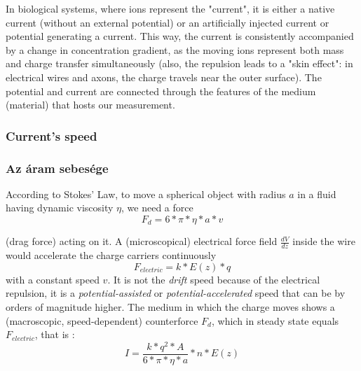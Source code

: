 \fi

\ifx\magyar\undefined
In biological systems, where ions represent the "current", it is either a native current (without an external potential) or an artificially injected current or potential generating a current.
This way, the current is consistently accompanied by a change in concentration gradient, as the moving ions represent both mass and charge transfer simultaneously (also, the repulsion leads to a "skin effect": in electrical wires and axons, the charge travels near
the outer surface).
The potential and current are
connected through the features of the medium (material) that hosts
our measurement. 
\else

\fi

\ifx\magyar\undefined
\subsubsection[Speed]{Current's speed\label{sec:Electricity-ion's-speed}}
\else
\subsubsection[Sebesség]{Az áram sebesége\label{sec:Electricity-ion's-speed}}

\fi

\ifx\magyar\undefined
According to Stokes' Law, to move a spherical object
with radius $a$ in a fluid having dynamic viscosity $\eta$, we need
a force
%
\begin{equation}
	F_{d}=6*\pi*\eta*a*v\label{eq:StokesForceOnIon}
\end{equation}

\noindent (drag force) acting on it. A (microscopical) electrical force
field $\frac{dV}{dz}$ inside the wire would accelerate the charge
carriers continuously
%
\begin{equation}
	F_{electric}=k* E(z) * q
\end{equation}
\noindent with a constant speed $v$. It is not the \emph{drift} speed because of the
electrical repulsion, it is a \emph{potential-assisted} or \emph{potential-accelerated} speed that can
be by orders of magnitude higher.  
The medium in which the charge moves shows a (macroscopic,
speed-dependent) counterforce $F_{d}$, which in steady state equals
$F_{electric}$, that is :
%
\begin{equation}
	I=\frac{k*q^{2}*A}{6*\pi*\eta*a}*n*E(z)
	\label{eq:StokesCurrent}
\end{equation}
\else
\fi

